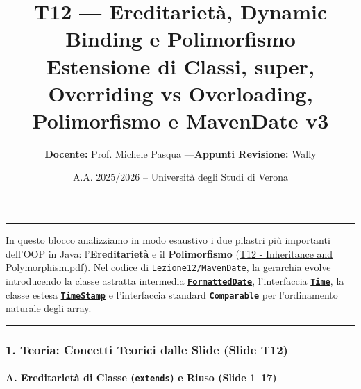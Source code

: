 \documentclass[11pt,a4paper]{article}
\title{\Huge\bfseries\sffamily\color{brandblue} T12 --- Ereditarietà, Dynamic Binding e Polimorfismo \\[0.3em] \large\sffamily Estensione di Classi, super, Overriding vs Overloading, Polimorfismo e MavenDate v3}
\author{\textbf{Docente:} Prof. Michele Pasqua \quad---\quad \textbf{Appunti Revisione:} Wally}
\date{A.A. 2025/2026 -- Universit\`a degli Studi di Verona}
\newcommand{\passthrough}[1]{#1}
\begin{document}
\maketitle
\thispagestyle{fancy}
\vspace{-1.2em}
\noindent\textcolor{brandblue}{\rule{\textwidth}{0.8pt}}
\vspace{1.2em}

In questo blocco analizziamo in modo esaustivo i due pilastri più
importanti dell'OOP in Java: l'\textbf{Ereditarietà} e il
\textbf{Polimorfismo}
(\href{file:///home/wally/Documenti/GitHub/Programmazione-II/25-26/Teoria-e-Esercitazioni/Slides-20260902/T12\%20-\%20Inheritance\%20and\%20Polymorphism.pdf}{T12
- Inheritance and Polymorphism.pdf}). Nel codice di
\href{file:///home/wally/Documenti/GitHub/Programmazione-II/25-26/Teoria-e-Esercitazioni/Codice-20260902/Lezione12/MavenDate}{\passthrough{\lstinline!Lezione12/MavenDate!}},
la gerarchia evolve introducendo la classe astratta intermedia
\textbf{\href{file:///home/wally/Documenti/GitHub/Programmazione-II/25-26/Teoria-e-Esercitazioni/Codice-20260902/Lezione12/MavenDate/src/main/java/it/oop/core/FormattedDate.java}{\passthrough{\lstinline!FormattedDate!}}},
l'interfaccia
\textbf{\href{file:///home/wally/Documenti/GitHub/Programmazione-II/25-26/Teoria-e-Esercitazioni/Codice-20260902/Lezione12/MavenDate/src/main/java/it/oop/core/Time.java}{\passthrough{\lstinline!Time!}}},
la classe estesa
\textbf{\href{file:///home/wally/Documenti/GitHub/Programmazione-II/25-26/Teoria-e-Esercitazioni/Codice-20260902/Lezione12/MavenDate/src/main/java/it/oop/core/TimeStamp.java}{\passthrough{\lstinline!TimeStamp!}}}
e l'interfaccia standard \textbf{\passthrough{\lstinline!Comparable!}}
per l'ordinamento naturale degli array.

\begin{center}\rule{0.5\linewidth}{0.5pt}\end{center}

\subsubsection{1. Teoria: Concetti Teorici dalle Slide (Slide
T12)}\label{teoria-concetti-teorici-dalle-slide-slide-t12}

\paragraph{\texorpdfstring{A. Ereditarietà di Classe (\texttt{extends})
e Riuso (Slide
1--17)}{A. Ereditarietà di Classe (extends) e Riuso (Slide 1--17)}}\label{a.-ereditarietuxe0-di-classe-extends-e-riuso-slide-117}
\end{document}
